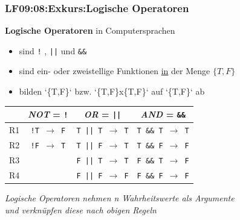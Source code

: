 \begin{frame}[fragile]  
  \frametitle{LF09:08:Exkurs:Logische Operatoren}
  \vspace{0.2cm}

  \begin{small}
  \textbf{Logische Operatoren} in Computersprachen
  \begin{itemize}
    \item sind \texttt{!} , \texttt{||} und \texttt{\&\&} 
    \item sind ein- oder zweistellige Funktionen \underline{in} der Menge $\{T,F\}$
    \item bilden `\{T,F\}` bzw. `\{T,F\}x\{T,F\}` auf `\{T,F\}` ab
  \end{itemize}
    
  \vspace{0.2cm}
  \begin{center}

      \renewcommand{\arraystretch}{1.3}
\begin{tabular}{c|c|c|c|}
  & \textit{NOT} = \texttt{!} & \textit{OR} = \texttt{||} & \textit{AND} = \texttt{\&\&} \\
  \hline
  R1 & \texttt{!T $\rightarrow$ F} & \texttt{T || T $\rightarrow$ T} & \texttt{T \&\& T $\rightarrow$ T} \\
  \hline
  R2 & \texttt{!F $\rightarrow$ T} & \texttt{T || F $\rightarrow$ T} & \texttt{T \&\& F $\rightarrow$ F} \\
  \hline
  R3 &  & \texttt{F || T $\rightarrow$ T} & \texttt{F \&\& T $\rightarrow$ F} \\
  \hline
  R4 &  & \texttt{F || F $\rightarrow$ F} & \texttt{F \&\& F $\rightarrow$ F} \\

\end{tabular}
    \end{center}
  \end{small}
  
  \vspace{0.5cm}
\begin{footnotesize}
    \begin{flushright}
      \textit{Logische Operatoren nehmen n Wahrheitswerte als Argumente \\
      und verknüpfen diese nach obigen Regeln}
    \end{flushright}
  \end{footnotesize}

\end{frame}

